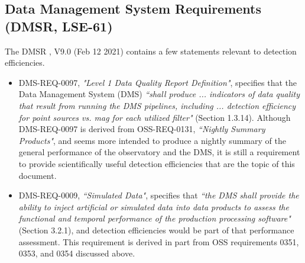 

\subsection{Data Management System Requirements (DMSR, LSE-61)}\label{ssec:docs_dmsr}

The DMSR , V9.0 (Feb 12 2021) contains a few statements relevant to detection efficiencies. 

\begin{itemize}

\item DMS-REQ-0097, {\it "Level 1 Data Quality Report Definition"}, specifies that the Data Management System (DMS) {\it ``shall produce ... indicators of data quality that result from running the DMS pipelines, including ... detection efficiency for point sources vs. mag for each utilized filter"} (Section 1.3.14).
Although DMS-REQ-0097 is derived from OSS-REQ-0131, {\it ``Nightly Summary Products"}, and seems more intended to produce a nightly summary of the general performance of the observatory and the DMS, it is still a requirement to provide scientifically useful detection efficiencies that are the topic of this document. 

\item DMS-REQ-0009, {\it ``Simulated Data"}, specifies that {\it ``the DMS shall provide the ability to inject artificial or simulated data into data products to assess the functional and temporal performance of the production processing software"} (Section 3.2.1), and detection efficiencies would be part of that performance assessment.
This requirement is derived in part from OSS requirements 0351, 0353, and 0354 discussed above.

\end{itemize}


